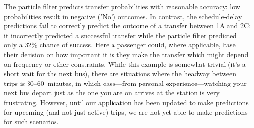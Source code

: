 \begin{knitrout}\small
{}\color{fgcolor}\begin{table}

\caption{\label{tab:eta_journey_transfer_res}Transfer probabilities}
\centering
\fontsize{8}{10}\selectfont
{}
\end{table}


\end{knitrout}


The particle filter predicts transfer probabilities with reasonable accuracy: low probabilities result in negative ('No') outcomes. In contrast, the schedule-delay predictions fail to correctly predict the outcome of a transfer between 1A and 2C: it incorrectly predicted a successful transfer while the particle filter predicted only a 32\% chance of success. Here a passenger could, where applicable, base their decision on how important it is they make the transfer which might depend on frequency or other constraints. While this example is somewhat trivial (it's a short wait for the next bus), there are situations where the headway between trips is 30--60~minutes, in which case---from personal experience---watching your next bus depart just as the one you are on arrives at the station is very frustrating. However, until our application has been updated to make predictions for upcoming (and not just active) trips, we are not yet able to make predictions for such scenarios.


